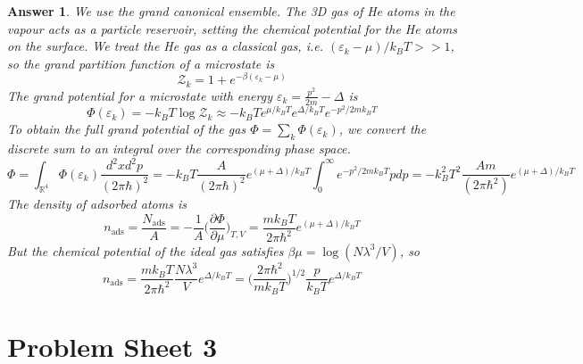 \documentclass[a4paper]{article}
\theoremstyle{new2}
\newtheorem{ans}{Answer}[section]
\theoremstyle{new}
\begin{document}
\begin{ans}
We use the grand canonical ensemble. The 3D gas of He atoms in the vapour acts as a particle reservoir, setting the chemical potential for the He atoms on the surface. We treat the He gas as a classical gas, i.e. $(\varepsilon_k-\mu)/k_BT>>1$, so the grand partition function of a microstate is
$$\mathcal{Z}_k=1+e^{-\beta(\varepsilon_k-\mu)}$$
The grand potential for a microstate with energy $\varepsilon_k=\frac{p^2}{2m}-\Delta$ is
$$\Phi(\varepsilon_k)=-k_BT\log\mathcal{Z}_k\approx-k_BTe^{\mu/k_BT}e^{\Delta/k_BT}e^{-p^2/2mk_BT}$$
To obtain the full grand potential of the gas $\Phi=\sum_k\Phi(\varepsilon_k)$, we convert the discrete sum to an integral over the corresponding phase space.
$$\Phi=\int_{\mathbb{R}^4}\Phi(\varepsilon_k)\frac{d^2xd^2p}{(2\pi\hbar)^2}=-k_BT\frac{A}{(2\pi\hbar)^2}e^{(\mu+\Delta)/k_BT}\int_0^\infty e^{-p^2/2mk_BT}pdp=-k_B^2T^2\frac{Am}{(2\pi\hbar^2)}e^{(\mu+\Delta)/k_BT}$$
The density of adsorbed atoms is
$$n_{\text{ads}}=\frac{N_{\text{ads}}}{A}=-\frac{1}{A}\bigg(\frac{\partial\Phi}{\partial\mu}\bigg)_{T,V}=\frac{mk_BT}{2\pi\hbar^2}e^{(\mu+\Delta)/k_BT}$$
But the chemical potential of the ideal gas satisfies $\beta\mu=\log(N\lambda^3/V)$, so
$$n_{\text{ads}}=\frac{mk_BT}{2\pi\hbar^2}\frac{N\lambda^3}{V}e^{\Delta/k_BT}=\bigg(\frac{2\pi\hbar^2}{mk_BT}\bigg)^{1/2}\frac{p}{k_BT}e^{\Delta/k_BT}$$
\end{ans}
\newpage
\section{Problem Sheet 3}
\end{document}
